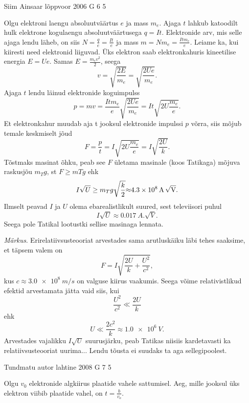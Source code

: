 \documentclass[11pt, twoside]{article}
\begin{document}
{%
{Siim Ainsaar} %
{lõppvoor} %
{2006} %
{G 6} %
{5} %
{

\ifSolution
Olgu elektroni laengu absoluutväärtus $e$ ja mass $m_e$. Ajaga $t$ lahkub katoodilt hulk elektrone kogulaengu absoluutväärtusega $q = It$. Elektronide arv, mis selle ajaga lendu läheb, on siis $N = \frac{q}{e} = \frac{It}{e}$ ja mass $m = Nm_e = \frac{Itm_e}{e}$. Leiame ka, kui kiiresti need elektronid liiguvad. Üks elektron saab elektronkahuris kineetilise energia $E = Ue$. Samas $E = \frac{m_ev^2}{2}$, seega
\[
v=\sqrt{\frac{2 E}{m_{e}}}=\sqrt{\frac{2 U e}{m_{e}}}. 
\]
Ajaga $t$ lendu läinud elektronide koguimpulss
\[
p=m v=\frac{I t m_{e}}{e} \sqrt{\frac{2 U e}{m_{e}}}=I t \sqrt{2 U \frac{m_{e}}{e}}.
\]
Et elektronkahur muudab aja t jooksul elektronide impulssi $p$ võrra, siis mõjub temale keskmiselt jõud
\[
F=\frac{p}{t}=I \sqrt{2 U \frac{m_{e}}{e}}=I \sqrt{\frac{2 U}{k}}.
\] 
Tõstmaks masinat õhku, peab see $F$ ületama masinale (koos Tatikaga) mõjuva raskusjõu $m_T g$, st $F \geq mT g$ ehk
\[
I \sqrt{U} \geq m_{T} g \sqrt{\frac{k}{2}} \SI{\approx 4,3e8}{A.\sqrt{V}}. 
\]
Ilmselt peavad $I$ ja $U$ olema ebarealistlikult suured, sest televiisori puhul 
\[
I \sqrt U \approx \SI{0,017}{A.\sqrt{V}}.
\]
Seega pole Tatikal lootustki sellise masinaga lennata.

\emph{Märkus}. Erirelatiivsusteooriat arvestades sama arutluskäiku läbi tehes saaksime, et täpsem valem on 
\[
F=I \sqrt{\frac{2 U}{k}+\frac{U^{2}}{c^{2}}},
\]
kus $c \approx \SI{3,0e8}{m/s}$ on valguse kiirus vaakumis. Seega võime relativistlikud efektid arvestamata jätta vaid siis, kui 
\[
\frac{U^2}{c^2} \ll \frac{2U}{k}
\]
ehk 
\[
U \ll \frac{2 c^{2}}{k} \approx \SI{1,0e6}{V}.
\] 
Arvestades vajalikku $I \sqrt U$ suurusjärku, peab Tatikas niisiis kardetavasti ka relatiivsusteooriat uurima... Lendu tõusta ei suudaks ta aga sellegipoolest.
\fi
}

{Tundmatu autor} %
{lahtine} %
{2008} %
{G 7} %
{5} %
{

\ifSolution
Olgu $v_0$ elektronide algkiirus plaatide vahele sattumisel. Aeg, mille jooksul üks elektron viibib plaatide vahel, on $t = \frac{b}{v_o}$.

}}
\end{document}
